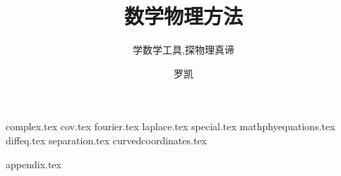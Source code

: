 \documentclass[
  lang=cn,
  10pt,
  mode=simple,
  color=blue, %
  ]{elegantbook}
\title{数学物理方法}
\subtitle{学数学工具,探物理真谛}
\author{罗凯}
\begin{document}
\maketitle
\frontmatter

\tableofcontents

\mainmatter


{complex.tex}
{cov.tex}
{fourier.tex}
{laplace.tex}
{special.tex}
{mathphyequations.tex}
{diffeq.tex}
{separation.tex}
{curvedcoordinates.tex}

{appendix.tex}



\nocite{*}
\printbibliography[heading=bibintoc, title=\ebibname]
\end{document}
